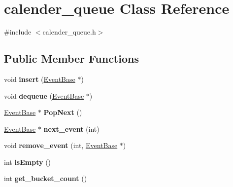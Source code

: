 \hypertarget{classcalender__queue}{\section{calender\-\_\-queue Class Reference}
\label{classcalender__queue}
}


{\ttfamily \#include $<$calender\-\_\-queue.\-h$>$}

\subsection*{Public Member Functions}
\begin{DoxyCompactItemize}
\item 
\hypertarget{classcalender__queue_a0427ba423314b787c91a5f38127d3e0c}{void {\bfseries insert} (\hyperlink{class_event_base}{Event\-Base} $\ast$)}\label{classcalender__queue_a0427ba423314b787c91a5f38127d3e0c}

\item 
\hypertarget{classcalender__queue_ac6e6562d1a4ca817d9747f7e901742be}{void {\bfseries dequeue} (\hyperlink{class_event_base}{Event\-Base} $\ast$)}\label{classcalender__queue_ac6e6562d1a4ca817d9747f7e901742be}

\item 
\hypertarget{classcalender__queue_aa789e7ebf2e4b0509ba6c986f4485655}{\hyperlink{class_event_base}{Event\-Base} $\ast$ {\bfseries Pop\-Next} ()}\label{classcalender__queue_aa789e7ebf2e4b0509ba6c986f4485655}

\item 
\hypertarget{classcalender__queue_a22d23f844d4318dbb693ae014028cc4f}{\hyperlink{class_event_base}{Event\-Base} $\ast$ {\bfseries next\-\_\-event} (int)}\label{classcalender__queue_a22d23f844d4318dbb693ae014028cc4f}

\item 
\hypertarget{classcalender__queue_a82e8a5aacee2ecce3c8bd39967cbd065}{void {\bfseries remove\-\_\-event} (int, \hyperlink{class_event_base}{Event\-Base} $\ast$)}\label{classcalender__queue_a82e8a5aacee2ecce3c8bd39967cbd065}

\item 
\hypertarget{classcalender__queue_a8d42460de7de2396f588c8f9a5aa099f}{int {\bfseries is\-Empty} ()}\label{classcalender__queue_a8d42460de7de2396f588c8f9a5aa099f}

\item 
\hypertarget{classcalender__queue_a78818b6767d5f432dd4b4e629ca72435}{int {\bfseries get\-\_\-bucket\-\_\-count} ()}\label{classcalender__queue_a78818b6767d5f432dd4b4e629ca72435}


\end{DoxyCompactItemize}
